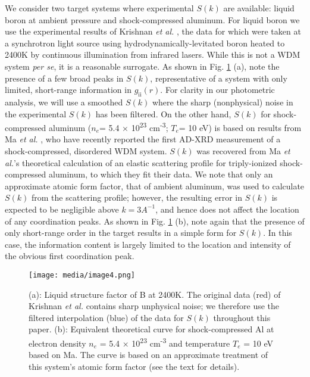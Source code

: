 We consider two target systems where experimental \(S(k)\) are
available: liquid boron at ambient pressure and shock-compressed
aluminum. For liquid boron we use the experimental results of Krishnan
\emph{et al.}
 \cite{krishnan1998structure, krishnan2000x},
the data for which were taken at a synchrotron light source using
hydrodynamically-levitated boron heated to 2400K by continuous
illumination from infrared lasers. While this is not a WDM system
\emph{per se}, it is a reasonable surrogate. As shown in Fig. \ref{edimage4} (a),
note the presence of a few broad peaks in \(S(k)\), representative of a
system with only limited, short-range information in
\(g_{\text{ii}}\left( r \right)\). For clarity in our photometric
analysis, we will use a smoothed \(S(k)\) where the sharp (nonphysical)
noise in the experimental \(S(k)\) has been filtered. On the other hand,
\(S(k)\) for shock-compressed aluminum (\(n_{e}\)= 5.4 ×
10\textsuperscript{23} cm\textsuperscript{-3}; \(T_{e}\)= 10 eV) is
based on results from Ma \emph{et
al.} \cite{ma2013x},
who have recently reported the first AD-XRD measurement of a
shock-compressed, disordered WDM system. \(S(k)\) was recovered from Ma
\emph{et al.}'s theoretical calculation of an elastic scattering profile
for triply-ionized shock-compressed aluminum, to which they fit their
data. We note that only an approximate atomic form factor, that of
ambient aluminum, was used to calculate \(S(k)\) from the scattering
profile; however, the resulting error in \(S(k)\) is expected to be
negligible above \(k = 3A^{- 1}\), and hence does not affect the
location of any coordination peaks. As shown in Fig. \ref{edimage4} (b), note again
that the presence of only short-range order in the target results in a
simple form for \(S(k)\). In this case, the information content is
largely limited to the location and intensity of the obvious first
coordination peak.

\begin{figure}[h] \label{edimage4}
\caption{ (a): Liquid structure factor of B at 2400K. The original data
(red) of Krishnan \emph{et al.} 
\cite{krishnan1998structure}
contains sharp unphysical noise; we therefore use the filtered
interpolation (blue) of the data for \(S(k)\) throughout this paper.
(b): Equivalent theoretical curve for shock-compressed Al at electron
density \(n_{e}\) = 5.4 × 10\textsuperscript{23} cm\textsuperscript{-3}
and temperature \(T_{e}\) = 10 eV based on Ma. \cite{ma2013x} 
The curve is based on an approximate treatment of this system's atomic
form factor (see the text for details).}
\centering
\texttt{[image: media/image4.png]}
\end{figure}

